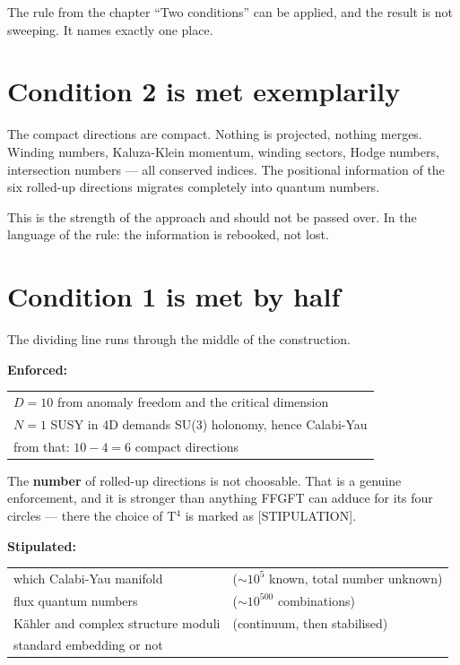 \documentclass[11pt]{report}
\begin{document}
The rule from the chapter \enquote{Two conditions} can be applied, and
the result is not sweeping. It names exactly one place.

\section{Condition 2 is met exemplarily}

The compact directions are compact. Nothing is projected, nothing
merges. Winding numbers, Kaluza-Klein momentum, winding sectors, Hodge
numbers, intersection numbers --- all conserved indices. The positional
information of the six rolled-up directions migrates completely into
quantum numbers.

This is the strength of the approach and should not be passed over. In
the language of the rule: the information is rebooked, not lost.

\section{Condition 1 is met by half}

The dividing line runs through the middle of the construction.

\textbf{Enforced:}
\begin{center}
\begin{tabular}{l}
$D = 10$ from anomaly freedom and the critical dimension \\
$N = 1$ SUSY in 4D demands SU(3) holonomy, hence Calabi-Yau \\
from that: $10 - 4 = 6$ compact directions \\
\end{tabular}
\end{center}

The \textbf{number} of rolled-up directions is not choosable. That is a
genuine enforcement, and it is stronger than anything FFGFT can adduce
for its four circles --- there the choice of T$^4$ is marked as
[STIPULATION].

\textbf{Stipulated:}
\begin{center}
\begin{tabular}{ll}
which Calabi-Yau manifold & ($\sim 10^5$ known, total number unknown) \\
flux quantum numbers & ($\sim 10^{500}$ combinations) \\
K\"ahler and complex structure moduli & (continuum, then stabilised) \\
standard embedding or not & \\
\end{tabular}
\end{center}
\end{document}
